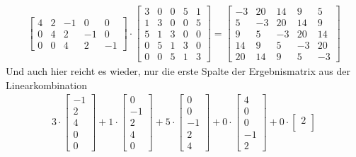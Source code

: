 \begin{ExCalc}
\begin{align}
\begin{bmatrix}
 4  &   2  &  -1  &   0  &   0\\
 0  &   4  &   2  &  -1  &   0\\
 0  &   0  &   4  &   2  &  -1
\end{bmatrix}
\cdot
\begin{bmatrix}
3  &   0  &   0  &   5  &   1\\
1  &   3  &   0  &   0  &   5\\
5  &   1  &   3  &   0  &   0\\
0  &   5  &   1  &   3  &   0\\
0  &   0  &   5  &   1  &   3
\end{bmatrix}
=
\begin{bmatrix}
-3  &  20  &  14  &   9  &  5\\
 5  &  -3  &  20  &  14  &  9\\
 9  &   5  &  -3  &  20  &  14\\
14  &   9  &   5  &  -3  &  20\\
20  &  14  &   9  &   5  &  -3
\end{bmatrix}
\end{align}
Und auch hier reicht es wieder, nur die erste Spalte der Ergebnismatrix aus der
Linearkombination
\begin{align}
3 \cdot
\begin{bmatrix}
-1\\
 2\\
 4\\
 0\\
 0
\end{bmatrix}
+ 1 \cdot
\begin{bmatrix}
0\\
-1\\
2\\
4\\
0
\end{bmatrix}
+ 5 \cdot
\begin{bmatrix}
0\\
0\\
-1\\
2\\
4
\end{bmatrix}
+ 0 \cdot
\begin{bmatrix}
4\\
0\\
0\\
-1\\
2
\end{bmatrix}
+ 0 \cdot
\begin{bmatrix}
2\\

\end{bmatrix}
\end{align}
\end{ExCalc}
